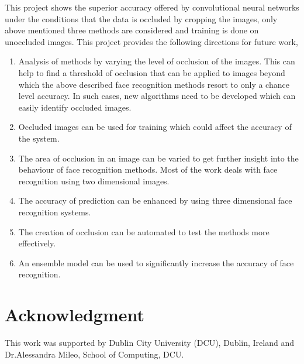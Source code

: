 \documentclass[conference]{IEEEtran}
\begin{document}
This project shows the superior accuracy offered by convolutional neural networks under the conditions that the data is occluded by cropping the images, only above mentioned three methods are considered and training is done on unoccluded images. This project provides the following directions for future work, 
\begin{enumerate}
\item Analysis of methods by varying the level of occlusion of the images. This can help to find a threshold of occlusion that can be applied to images beyond which the above described face recognition methods resort to only a chance level accuracy. In such cases, new algorithms need to be developed which can easily identify occluded images.

\item Occluded images can be used for training which could affect the accuracy of the system.

\item The area of occlusion in an image can be varied to get further insight into the behaviour of face recognition methods. 
Most of the work deals with face recognition using two dimensional images.

\item The accuracy of prediction can be enhanced by using three dimensional face recognition systems.

\item The creation of occlusion can be automated to test the methods more effectively.

\item An ensemble model can be used to significantly increase the accuracy of face recognition.


\end{enumerate}
 


\section*{Acknowledgment}
This work was supported by Dublin City University (DCU), Dublin, Ireland and Dr.Alessandra Mileo, School of Computing, DCU.



\end{document}
